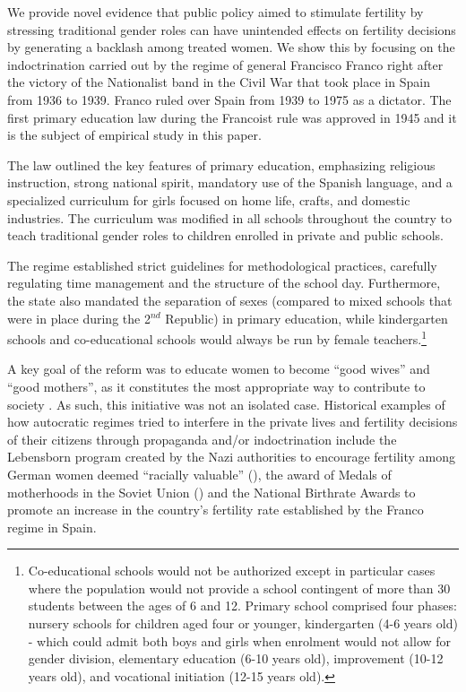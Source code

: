 \documentclass[a4paper,oneside,final,onecolumn,11pt,english]{article}
\begin{document}
We provide novel evidence that public policy aimed to stimulate fertility by stressing traditional gender roles can have unintended effects on fertility decisions by generating a backlash among treated women. We show this by focusing on the indoctrination carried out by the regime of general Francisco Franco right after the victory of the Nationalist band in the Civil War that took place in Spain from 1936 to 1939. Franco ruled over Spain from 1939 to 1975 as a dictator. 
The first primary education law during the Francoist rule was approved in 1945 and it is the subject of empirical study in this paper.

The law outlined the key features of primary education, emphasizing religious instruction, strong national spirit, mandatory use of the Spanish language, and a specialized curriculum for girls focused on home life, crafts, and domestic industries. The curriculum was modified in all schools throughout the country to teach traditional gender roles to children enrolled in private and public schools. 

The regime established strict guidelines for methodological practices,  carefully regulating time management and the structure of the school day. %
Furthermore, the state also mandated the separation of sexes (compared to mixed schools that were in place during the 2$^{nd}$ Republic) in primary education, while kindergarten schools and co-educational schools would always be run by female teachers.\footnote{Co-educational schools would not be authorized except in particular cases where the population would not provide a school contingent of more than 30 students between the ages of 6 and 12. Primary school comprised four phases: nursery schools for children aged four or younger,  kindergarten (4-6 years old) - which could admit both boys and girls when enrolment would not allow for gender division, elementary education (6-10 years old), improvement (10-12 years old), and vocational initiation (12-15 years old).} 

A key goal of the reform was to educate women to become “good wives” and “good mothers”, as it constitutes the most appropriate way to contribute to society \citep[p. 213]{perez_canto}. As such, this initiative was not an isolated case. Historical examples of how autocratic regimes tried to interfere in the private lives and fertility decisions of their citizens through propaganda and/or indoctrination include the Lebensborn program created by the Nazi authorities to %
 encourage fertility among German women deemed “racially valuable” (\citeauthor{holocaust}), the award of Medals of motherhoods in the Soviet Union (\citeauthor{cabinet_oxford}) and the National Birthrate Awards to promote an increase in the country's fertility rate established by the Franco regime in Spain. 
 
\end{document}
